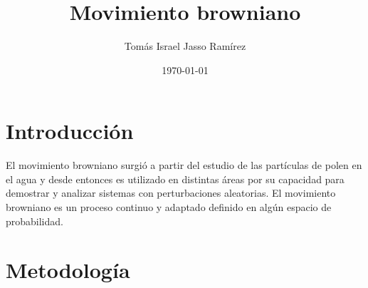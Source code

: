 \documentclass[12pt]{article}
\title{Movimiento browniano}				%
\author{Tomás Israel Jasso Ramírez}			%
\date{\today}								%
\begin{document}



\section{Introducción}
El movimiento browniano surgió a partir del estudio de las partículas de polen en el agua y desde entonces es utilizado en distintas áreas por su capacidad para demostrar y analizar sistemas con perturbaciones aleatorias. El movimiento browniano es un proceso continuo y adaptado definido en algún espacio de probabilidad. \cite{Leon}

\section{Metodología}




\end{document}
